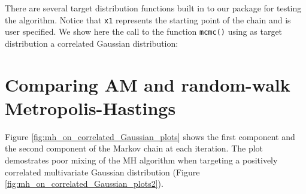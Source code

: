 \documentclass{article}
\begin{document}
There are several target distribution functions built in to our package for testing the algorithm. Notice that \texttt{x1} represents the starting point of the chain and is user specified. We show here the call to the function \texttt{mcmc()} using as target distribution a correlated Gaussian distribution:

\begin{knitrout}
\color{fgcolor}\begin{kframe}
\begin{alltt}
 \hlkwb{=} \hlstd{(} 
          
          
          
         \hlstd{)}
\end{alltt}
\end{kframe}
\end{knitrout}



\section{Comparing AM and random-walk Metropolis-Hastings}

Figure \ref{fig:mh_on_correlated_Gaussian_plots} shows the first component and the second component of the Markov chain at each iteration. The plot demostrates poor mixing of the MH algorithm when targeting a positively correlated multivariate Gaussian distribution (Figure \ref{fig:mh_on_correlated_Gaussian_plots2}). %
\end{document}
